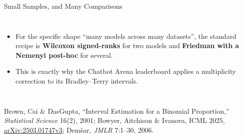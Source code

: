\begin{frame}{Small Samples, and Many Comparisons}
\begin{columns}[T,onlytextwidth]
\begin{itemize}
        \item[\textcolor{red}{$\blacktriangleright$}] For the specific shape ``many models across many datasets'', the standard recipe is \textbf{Wilcoxon signed-ranks} for two models and \textbf{Friedman with a Nemenyi post-hoc} for several.
        \item[\textcolor{red}{$\blacktriangleright$}] This is exactly why the Chatbot Arena leaderboard applies a multiplicity correction to its Bradley--Terry intervals.
      \end{itemize}
  \end{columns}
  {\scriptsize Brown, Cai \& DasGupta, ``Interval Estimation for a Binomial Proportion,'' \textit{Statistical Science} 16(2), 2001; Bowyer, Aitchison \& Ivanova, ICML 2025, \href{https://arxiv.org/abs/2503.01747v3}{arXiv:2503.01747v3}; Dem\v{s}ar, \textit{JMLR} 7:1--30, 2006.}
\end{frame}

